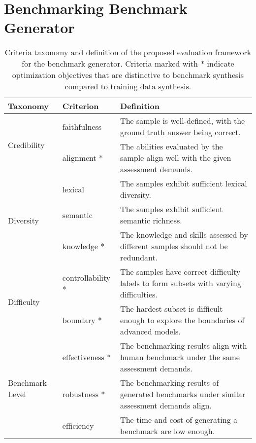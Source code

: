 \section{Benchmarking Benchmark Generator}
\label{sec:pre}

\begin{table*}[t]
    \renewcommand\arraystretch{1.3}
    \small
    \centering
    \caption{Criteria taxonomy and definition of the proposed evaluation framework for the benchmark generator. Criteria marked with * indicate optimization objectives that are distinctive to benchmark synthesis compared to training data synthesis.}
    \setlength{\tabcolsep}{0.3em} %
    \begin{tabular}{lll}
    \toprule
    \textbf{Taxonomy}&\textbf{Criterion} & \textbf{Definition}  \\
    \midrule
    \multirow{2}{*}{Credibility}&faithfulness&The sample is well-defined, with the ground truth answer being correct.\\
    \multirow{2}{*}{}&alignment *&The abilities evaluated by the sample align well with the given assessment demands.\\
    \hline
    \multirow{3}{*}{Diversity}&lexical&The samples exhibit sufficient lexical diversity.\\
    \multirow{3}{*}{}&semantic&The samples exhibit sufficient semantic richness.\\
    \multirow{3}{*}{}&knowledge *&The knowledge and skills assessed by different samples should not be redundant.\\
    \hline
    \multirow{2}{*}{Difficulty}&controllability *&The samples have correct difficulty labels to form subsets with varying difficulties.\\
    \multirow{2}{*}{}&boundary *&The hardest subset is difficult enough to explore the boundaries of advanced models.\\
    \hline
    \multirow{3}{*}{Benchmark-Level}&effectiveness *&The benchmarking results align with human benchmark under the same assessment demands.\\
    \multirow{3}{*}{}&robustness *&The benchmarking results of generated benchmarks under similar assessment demands align.\\
    \multirow{3}{*}{}&efficiency&The time and cost of generating a benchmark are low enough.\\
    \bottomrule
    \end{tabular}
    \vspace{-3pt}
    \label{tab: criteria}
\end{table*}

